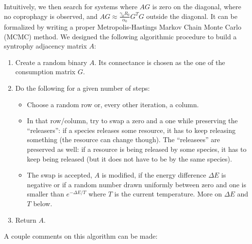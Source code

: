 \documentclass[12pt, titlepage]{report}
\begin{document}
Intuitively, we then search for systems where $AG$ is zero on the diagonal, \ie where no coprophagy is observed, and $AG \approx \frac{\gamma_0R_0}{\alpha_0}G^TG$ outside the diagonal. It can be formalized by writing a proper Metropolis-Hastings Markov Chain Monte Carlo (MCMC) method. We designed the following algorithmic procedure to build a syntrophy adjacency matrix $A$:
\begin{enumerate}
\item Create a random binary $A$. Its connectance is chosen as the one of the consumption matrix $G$.
\item Do the following for a given number of steps:
\begin{itemize}
\item Choose a random row or, every other iteration, a column.
\item In that row/column, try to swap a zero and a one while preserving the ``releasers'': if a species releases some resource, it has to keep releasing something (the resource can change though). The ``releasees'' are preserved as well: if a resource is being released by some species, it has to keep being released (but it does not have to be by the same species).
\item The swap is accepted, \ie $A$ is modified, if the energy difference $\Delta E$ is negative or if a random number drawn uniformly between zero and one is smaller than $e^{-\Delta E/T}$ where $T$ is the current temperature. More on $\Delta E$ and $T$ below.
\end{itemize}
\item Return $A$.
\end{enumerate}
A couple comments on this algorithm can be made:
\end{document}
